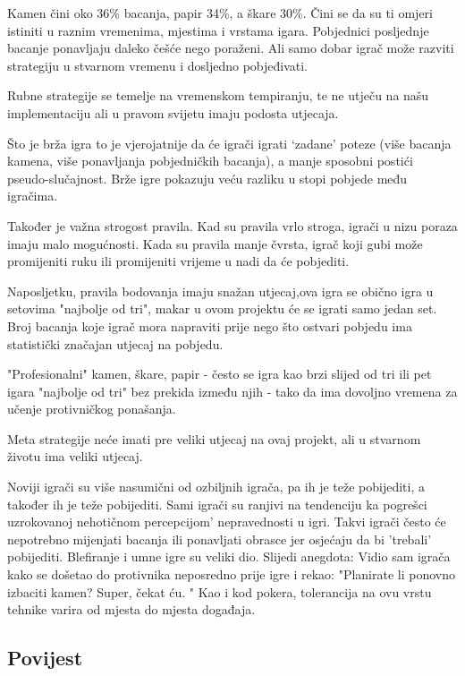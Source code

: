 \documentclass{foi}
\begin{document}
Kamen čini oko 36\% bacanja, papir 34\%, a škare 30\%. Čini se da su ti omjeri istiniti u raznim vremenima, mjestima i vrstama igara.
Pobjednici posljednje bacanje ponavljaju daleko češće nego poraženi.
Ali samo dobar igrač može razviti strategiju u stvarnom vremenu i dosljedno pobjeđivati.

Rubne strategije se temelje na vremenskom tempiranju, te ne utječu na našu implementaciju ali u pravom svijetu imaju podosta utjecaja.

Što je brža igra to je vjerojatnije da će igrači igrati ‘zadane’ poteze (više bacanja kamena, više ponavljanja pobjedničkih bacanja), a manje sposobni postići pseudo-slučajnost. Brže igre pokazuju veću razliku u stopi pobjede među igračima.

Također je važna strogost pravila. Kad su pravila vrlo stroga, igrači u nizu poraza imaju malo mogućnosti. Kada su pravila manje čvrsta, igrač koji gubi može promijeniti ruku ili promijeniti vrijeme u nadi da će pobjediti.

Naposljetku, pravila bodovanja imaju snažan utjecaj,ova igra se obično igra u setovima "najbolje od tri", makar u ovom projektu će se igrati samo jedan set. Broj bacanja koje igrač mora napraviti prije nego što ostvari pobjedu ima statistički značajan utjecaj na pobjedu.

"Profesionalni" kamen, škare, papir -  često se igra kao brzi slijed od tri ili pet igara "najbolje od tri" bez prekida između njih - tako da ima dovoljno vremena za učenje protivničkog ponašanja.

Meta strategije neće imati pre veliki utjecaj na ovaj projekt, ali u stvarnom životu ima veliki utjecaj.

Noviji igrači su više nasumični od ozbiljnih igrača, pa ih je teže pobijediti, a također ih je teže pobijediti.
Sami igrači su ranjivi na tendenciju ka pogrešci uzrokovanoj nehotičnom percepcijom' nepravednosti u igri. Takvi igrači često će nepotrebno mijenjati bacanja ili ponavljati obrasce jer osjećaju da bi 'trebali' pobijediti.
Blefiranje i umne igre su veliki dio. Slijedi anegdota:
Vidio sam igrača kako se došetao do protivnika neposredno prije igre i rekao: "Planirate li ponovno izbaciti kamen? Super, čekat ću. " Kao i kod pokera, tolerancija na ovu vrstu tehnike varira od mjesta do mjesta događaja.

\subsection{Povijest}
\end{document}
